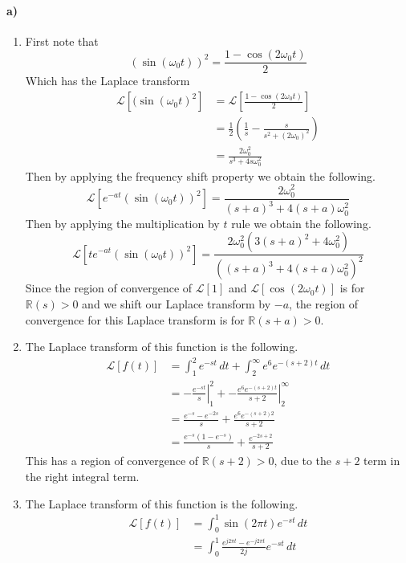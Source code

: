 \documentclass[12pt]{article}
\begin{document}
\paragraph{a)}

\begin{enumerate}
    \item First note that
    \[(\sin(\omega_0 t))^2 = \frac{1-\cos(2\omega_0 t)}{2}\]
    Which has the Laplace transform
    \begin{align*}
        \mathcal{L}\left[(\sin(\omega_0 t)^2\right]&=\mathcal{L}\left[\frac{1-\cos(2\omega_0 t)}{2}\right]\\
        &=\frac{1}{2}\left(\frac{1}{s}-\frac{s}{s^2+(2\omega_0)^2}\right)\\
        &=\frac{2\omega_0^2}{s^3+4s\omega_0^2}
    \end{align*}
    Then by applying the frequency shift property we obtain the following.
    \[\mathcal{L}\left[e^{-at}(\sin(\omega_0 t))^2\right]=\frac{2\omega_0^2}{(s+a)^3+4(s+a)\omega_0^2}\]
    Then by applying the multiplication by \(t\) rule we obtain the following.
    \[\mathcal{L}\left[te^{-at}(\sin(\omega_0 t))^2\right]=\frac{2\omega_0^2(3(s+a)^2+4\omega_0^2)}{((s+a)^3+4(s+a)\omega_0^2)^2}\]
    Since the region of convergence of \(\mathcal{L}[1]\) and \(\mathcal{L}[\cos(2\omega_0 t)]\) is for \(\mathbb{R}(s)>0\) and we shift our Laplace
    transform by \(-a\), the region of convergence for this Laplace transform is for \(\mathbb{R}(s+a)>0\).
    \item The Laplace transform of this function is the following.
    \begin{align*}
        \mathcal{L}[f(t)] &= \int_1^2 e^{-st}\,dt + \int_2^\infty e^6e^{-(s+2)t}\,dt\\
        &=\left.-\frac{e^{-st}}{s}\right|_1^2 + \left.-\frac{e^6e^{-(s+2)t}}{s+2}\right|_2^\infty\\
        &=\frac{e^{-s}-e^{-2s}}{s} + \frac{e^6e^{-(s+2)2}}{s+2}\\
        &=\frac{e^{-s}(1-e^{-s})}{s} + \frac{e^{-2s+2}}{s+2}
    \end{align*}
    This has a region of convergence of \(\mathbb{R}(s+2)>0\), due to the \(s+2\) term in the right integral term.
    \item The Laplace transform of this function is the following.
    \begin{align*}
        \mathcal{L}[f(t)] &= \int_0^1 \sin(2\pi t)e^{-st}\,dt\\
        &=\int_0^1 \frac{e^{j2\pi t}-e^{-j2\pi t}}{2j}e^{-st}\,dt\\

\end{align*}
\end{enumerate}
\end{document}

